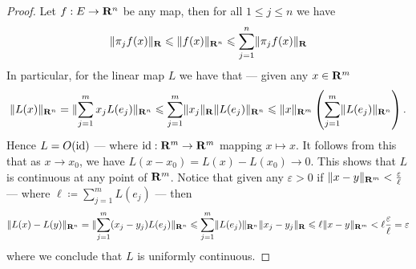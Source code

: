 \begin{proof}
    Let \(f: E \to \mathbf{R}^n\) be any map, then for all \(1 \leq j \leq n\) we have
    \[
        \lVert\pi_j  f(x)\rVert_{\mathbf{R}} \leqslant \lVert f(x)\rVert_{\mathbf{R}^n} \leqslant \sum_{j=1}^n
        \lVert\pi_j  f(x)\rVert_{\mathbf{R}}
    \]
    In particular, for the linear map \(L\) we have that --- given any \(x \in
    \mathbf{R}^m\)
    \[
        \lVert L(x)\rVert_{\mathbf{R}^n} = \lVert\sum_{j=1}^m x_j L(e_j)\rVert_{\mathbf{R}^n}
        \leqslant \sum_{j=1}^m \lVert x_j\rVert_{\mathbf{R}} \lVert L(e_j)\rVert_{\mathbf{R}^n}
        \leqslant \lVert x\rVert_{\mathbf{R}^m} \left( \sum_{j=1}^m \lVert L(e_j)\rVert_{\mathbf{R}^n} \right).
    \]
    Hence \(L = O(\operatorname{id})\) --- where \(\operatorname{id}: \mathbf{R}^m \to \mathbf{R}^m\) mapping \(x \mapsto x\). It
    follows from this that as \(x \to x_0\), we have \(L(x - x_0) = L(x) - L(x_0) \to
    0\). This shows that \(L\) is continuous at any point of \(\mathbf{R}^m\). Notice that
    given any \(\varepsilon > 0\) if \(\lVert x - y\rVert_{\mathbf{R}^m} < \frac \varepsilon \ell\) --- where \(\ell \coloneq
    \sum_{j=1}^m L(e_j)\) --- then
    \[
        \lVert L(x) - L(y)\rVert_{\mathbf{R}^n} = \lVert\sum_{j=1}^m (x_j - y_j) L(e_j) \rVert_{\mathbf{R}^n}
        \leqslant \sum_{j=1}^m \lVert L(e_j)\rVert_{\mathbf{R}^n} \lVert x_j - y_j\rVert_{\mathbf{R}}
        \leqslant \ell \lVert x - y\rVert_{\mathbf{R}^m}
        < \ell \frac \varepsilon \ell = \varepsilon
    \]
    where we conclude that \(L\) is uniformly continuous.
\end{proof}
